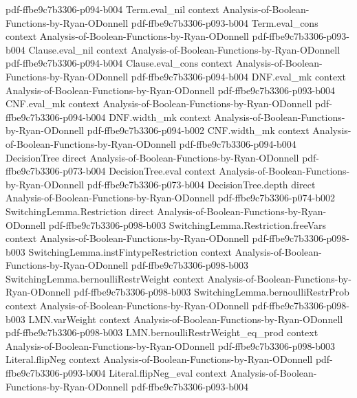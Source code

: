 \begin{theorem}
  {pdf-ffbe9c7b3306-p094-b004}
\proofstep
  {Term.eval_nil}
  {context}
  {Analysis-of-Boolean-Functions-by-Ryan-ODonnell}
  {pdf-ffbe9c7b3306-p093-b004}
\proofstep
  {Term.eval_cons}
  {context}
  {Analysis-of-Boolean-Functions-by-Ryan-ODonnell}
  {pdf-ffbe9c7b3306-p093-b004}
\proofstep
  {Clause.eval_nil}
  {context}
  {Analysis-of-Boolean-Functions-by-Ryan-ODonnell}
  {pdf-ffbe9c7b3306-p094-b004}
\proofstep
  {Clause.eval_cons}
  {context}
  {Analysis-of-Boolean-Functions-by-Ryan-ODonnell}
  {pdf-ffbe9c7b3306-p094-b004}
\proofstep
  {DNF.eval_mk}
  {context}
  {Analysis-of-Boolean-Functions-by-Ryan-ODonnell}
  {pdf-ffbe9c7b3306-p093-b004}
\proofstep
  {CNF.eval_mk}
  {context}
  {Analysis-of-Boolean-Functions-by-Ryan-ODonnell}
  {pdf-ffbe9c7b3306-p094-b004}
\proofstep
  {DNF.width_mk}
  {context}
  {Analysis-of-Boolean-Functions-by-Ryan-ODonnell}
  {pdf-ffbe9c7b3306-p094-b002}
\proofstep
  {CNF.width_mk}
  {context}
  {Analysis-of-Boolean-Functions-by-Ryan-ODonnell}
  {pdf-ffbe9c7b3306-p094-b004}
\proofstep
  {DecisionTree}
  {direct}
  {Analysis-of-Boolean-Functions-by-Ryan-ODonnell}
  {pdf-ffbe9c7b3306-p073-b004}
\proofstep
  {DecisionTree.eval}
  {context}
  {Analysis-of-Boolean-Functions-by-Ryan-ODonnell}
  {pdf-ffbe9c7b3306-p073-b004}
\proofstep
  {DecisionTree.depth}
  {direct}
  {Analysis-of-Boolean-Functions-by-Ryan-ODonnell}
  {pdf-ffbe9c7b3306-p074-b002}
\proofstep
  {SwitchingLemma.Restriction}
  {direct}
  {Analysis-of-Boolean-Functions-by-Ryan-ODonnell}
  {pdf-ffbe9c7b3306-p098-b003}
\proofstep
  {SwitchingLemma.Restriction.freeVars}
  {context}
  {Analysis-of-Boolean-Functions-by-Ryan-ODonnell}
  {pdf-ffbe9c7b3306-p098-b003}
\proofstep
  {SwitchingLemma.instFintypeRestriction}
  {context}
  {Analysis-of-Boolean-Functions-by-Ryan-ODonnell}
  {pdf-ffbe9c7b3306-p098-b003}
\proofstep
  {SwitchingLemma.bernoulliRestrWeight}
  {context}
  {Analysis-of-Boolean-Functions-by-Ryan-ODonnell}
  {pdf-ffbe9c7b3306-p098-b003}
\proofstep
  {SwitchingLemma.bernoulliRestrProb}
  {context}
  {Analysis-of-Boolean-Functions-by-Ryan-ODonnell}
  {pdf-ffbe9c7b3306-p098-b003}
\proofstep
  {LMN.varWeight}
  {context}
  {Analysis-of-Boolean-Functions-by-Ryan-ODonnell}
  {pdf-ffbe9c7b3306-p098-b003}
\proofstep
  {LMN.bernoulliRestrWeight_eq_prod}
  {context}
  {Analysis-of-Boolean-Functions-by-Ryan-ODonnell}
  {pdf-ffbe9c7b3306-p098-b003}
\proofstep
  {Literal.flipNeg}
  {context}
  {Analysis-of-Boolean-Functions-by-Ryan-ODonnell}
  {pdf-ffbe9c7b3306-p093-b004}
\proofstep
  {Literal.flipNeg_eval}
  {context}
  {Analysis-of-Boolean-Functions-by-Ryan-ODonnell}
  {pdf-ffbe9c7b3306-p093-b004}

\end{theorem}
